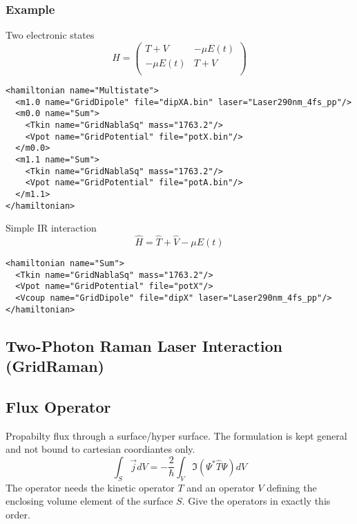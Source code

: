 \documentclass[a4paper,12pt]{scrbook}
\begin{document}
\subsubsection*{Example}
Two electronic states
\begin{equation}
 \hat H = \begin{pmatrix}T + V & -\mu E(t) \\ -\mu E(t) & T + V\\\end{pmatrix}
\end{equation}
\begin{verbatim}
<hamiltonian name="Multistate">
  <m1.0 name="GridDipole" file="dipXA.bin" laser="Laser290nm_4fs_pp"/>
  <m0.0 name="Sum">
    <Tkin name="GridNablaSq" mass="1763.2"/>
    <Vpot name="GridPotential" file="potX.bin"/>
  </m0.0>
  <m1.1 name="Sum">
    <Tkin name="GridNablaSq" mass="1763.2"/>
    <Vpot name="GridPotential" file="potA.bin"/>
  </m1.1>
</hamiltonian>
\end{verbatim}
Simple IR interaction
\begin{equation}
 \hat H = \hat T + \hat V  -\mu E(t)
\end{equation}
\begin{verbatim}
<hamiltonian name="Sum">
  <Tkin name="GridNablaSq" mass="1763.2"/>
  <Vpot name="GridPotential" file="potX"/>
  <Vcoup name="GridDipole" file="dipX" laser="Laser290nm_4fs_pp"/>
</hamiltonian>
\end{verbatim}

\subsection{Two-Photon Raman Laser Interaction (GridRaman)}

\subsection{Flux Operator}
Propabilty flux through a surface/hyper surface. The formulation
is kept general and not bound to cartesian coordiantes only.
\begin{equation}
 \int_S \vec{j} dV = -\frac{2}{\hbar} \int_V \Im(\Psi^* \hat T \Psi)dV
\end{equation}
The operator needs the kinetic operator $T$ and an operator $V$
defining the enclosing volume element of the surface $S$.
Give the operators in exactly this order.
\end{document}
